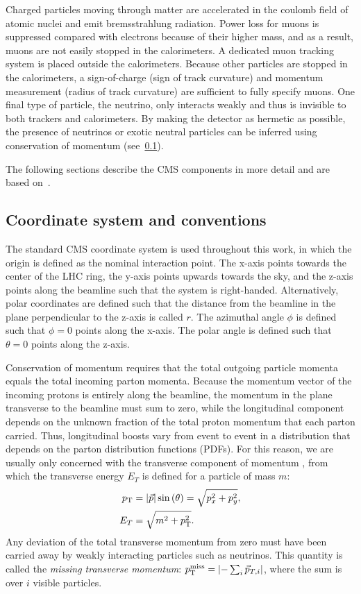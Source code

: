 Charged particles moving through matter are accelerated in the coulomb field of
atomic nuclei and emit bremsstrahlung radiation. Power loss for muons is
suppressed compared with electrons because of their higher mass, and as a
result, muons are not easily stopped in the calorimeters. A dedicated muon
tracking system is placed outside the calorimeters. Because other particles are
stopped in the calorimeters, a sign-of-charge (sign of track curvature) and
momentum measurement (radius of track curvature) are sufficient to fully specify
muons. One final type of particle, the neutrino, only interacts weakly and thus
is invisible to both trackers and calorimeters. By making the detector as
hermetic as possible, the presence of neutrinos or exotic neutral particles can
be inferred using conservation of momentum (see~\cref{sec:coordinates}).

The following sections describe the CMS components in more detail and are based
on~\cite{1748-0221-3-08-S08004}.

\subsection{Coordinate system and conventions}
\label{sec:coordinates}
The standard CMS coordinate system is used throughout this work, in which the
origin is defined as the nominal interaction point. The x-axis points towards
the center of the LHC ring, the y-axis points upwards towards the sky, and the
z-axis points along the beamline such that the system is right-handed.
Alternatively, polar coordinates are defined such that the distance from the
beamline in the plane perpendicular to the z-axis is called $r$. The azimuthal
angle $\phi$ is defined such that $\phi=0$ points along the x-axis. The polar
angle is defined such that $\theta=0$ points along the z-axis.

Conservation of momentum requires that the total outgoing particle momenta
equals the total incoming parton momenta. Because the momentum vector of the
incoming protons is entirely along the beamline, the momentum in the plane
transverse to the beamline must sum to zero, while the longitudinal component
depends on the unknown fraction of the total proton momentum that each parton
carried. Thus, longitudinal boosts vary from event to event in a distribution
that depends on the parton distribution functions (PDFs). For this reason, we
are usually only concerned with the transverse component of momentum \pT, from
which the transverse energy $E_T$ is defined for a particle of mass $m$:
\begin{align}
  p_\text{T} &= |\vec{p}| \sin\left(\theta\right) = \sqrt{p_x^2 + p_y^2}, \\
  E_T &= \sqrt{m^2 + p_\text{T}^2}.
\end{align}
Any deviation of the total transverse momentum from zero must have been carried
away by weakly interacting particles such as neutrinos. This quantity is called
the \textit{missing transverse momentum}: $p_\text{T}^\text{miss} = \lvert- \sum_i
\vec{p}_{T,i}\rvert$, where the sum is over $i$ visible particles.

